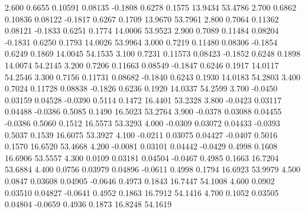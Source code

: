    2.600   0.6655   0.10591   0.08135  -0.1808   0.6278   0.1575  13.9434  53.4786
   2.700   0.6862   0.10836   0.08122  -0.1817   0.6267   0.1709  13.9670  53.7961
   2.800   0.7064   0.11362   0.08121  -0.1833   0.6251   0.1774  14.0006  53.9523
   2.900   0.7089   0.11484   0.08204  -0.1831   0.6250   0.1793  14.0026  53.9964
   3.000   0.7219   0.11480   0.08306  -0.1854   0.6249   0.1869  14.0045  54.1535
   3.100   0.7231   0.11573   0.08423  -0.1852   0.6248   0.1898  14.0074  54.2145
   3.200   0.7206   0.11663   0.08549  -0.1847   0.6246   0.1917  14.0117  54.2546
   3.300   0.7156   0.11731   0.08682  -0.1840   0.6243   0.1930  14.0183  54.2803
   3.400   0.7024   0.11728   0.08838  -0.1826   0.6236   0.1920  14.0337  54.2599
   3.700  -0.0450   0.03159   0.04528  -0.0390   0.5114   0.1472  16.4401  53.2328
   3.800  -0.0423   0.03117   0.04488  -0.0386   0.5085   0.1490  16.5023  53.2764
   3.900  -0.0378   0.03088   0.04455  -0.0386   0.5060   0.1512  16.5573  53.3293
   4.000  -0.0309   0.03072   0.04433  -0.0393   0.5037   0.1539  16.6075  53.3927
   4.100  -0.0211   0.03075   0.04427  -0.0407   0.5016   0.1570  16.6520  53.4668
   4.200  -0.0081   0.03101   0.04442  -0.0429   0.4998   0.1608  16.6906  53.5557
   4.300   0.0109   0.03181   0.04504  -0.0467   0.4985   0.1663  16.7204  53.6884
   4.400   0.0756   0.03979   0.04896  -0.0611   0.4998   0.1794  16.6923  53.9979
   4.500   0.0847   0.03608   0.04905  -0.0646   0.4973   0.1843  16.7447  54.1008
   4.600   0.0902   0.03510   0.04827  -0.0641   0.4952   0.1863  16.7912  54.1416
   4.700   0.1052   0.03505   0.04804  -0.0659   0.4936   0.1873  16.8248  54.1619
